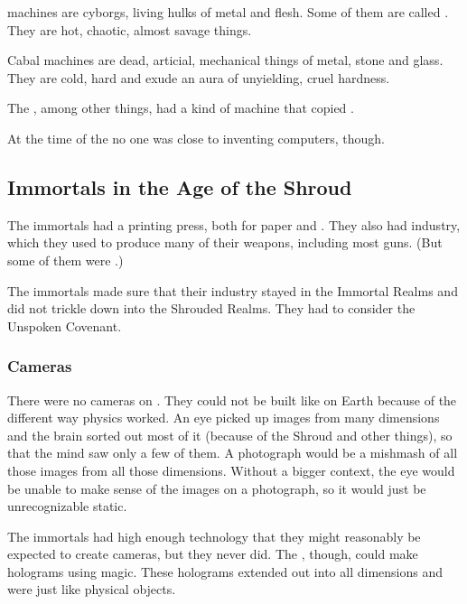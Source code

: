 \Draconic{} machines are cyborgs, living hulks of metal and flesh. 
Some of them are called \colossi. They are hot, chaotic, almost savage things. 

Cabal machines are dead, articial, mechanical things of metal, stone and glass. They are cold, hard and exude an aura of unyielding, cruel hardness. 

The \resphain, among other things, had a kind of machine that copied . 

At the time of the \thirdbanewar{} no one was close to inventing computers, though. 









\subsection{Immortals in the {Age of the Shroud}}
The immortals had a printing press, both for paper and .
They also had industry, which they used to produce many of their weapons, including most guns. 
(But some of them were .)

The immortals made sure that their industry stayed in the Immortal Realms and did not trickle down into the Shrouded Realms.
They had to consider the Unspoken Covenant.





\subsubsection{Cameras}
There were no cameras on \Miith. 
They could not be built like on Earth because of the different way \Miithian physics worked. 
An eye picked up images from many dimensions and the brain sorted out most of it (because of the Shroud and other things), so that the mind saw only a few of them. 
A photograph would be a mishmash of all those images from all those dimensions. 
Without a bigger context, the eye would be unable to make sense of the images on a photograph, so it would just be unrecognizable static. 

The immortals had high enough technology that they might reasonably be expected to create cameras, but they never did. 
The \ophidians, though, could make holograms using magic. 
These holograms extended out into all dimensions and were just like physical objects. 











